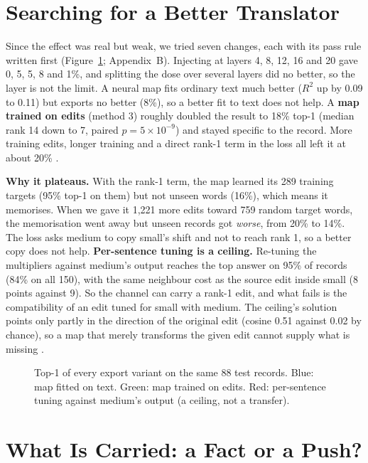 \section{Searching for a Better Translator}\label{sec:search}

Since the effect was real but weak, we tried seven changes, each with its pass rule written first (Figure~\ref{fig:ladder}; Appendix~B). Injecting at layers 4, 8, 12, 16 and 20 gave 0, 5, 5, 8 and 1\%, and splitting the dose over several layers did no better, so the layer is not the limit. A neural map fits ordinary text much better ($R^2$ up by 0.09 to 0.11) but exports no better (8\%), so a better fit to text does not help. A \textbf{map trained on edits} (method 3) roughly doubled the result to 18\% top-1 (median rank 14 down to 7, paired $p=5\times10^{-9}$) and stayed specific to the record. More training edits, longer training and a direct rank-1 term in the loss all left it at about 20\% \cite{p16,p17}.

\textbf{Why it plateaus.} With the rank-1 term, the map learned its 289 training targets (95\% top-1 on them) but not unseen words (16\%), which means it memorises. When we gave it 1,221 more edits toward 759 random target words, the memorisation went away but unseen records got \emph{worse}, from 20\% to 14\%. The loss asks medium to copy small's shift and not to reach rank 1, so a better copy does not help. \textbf{Per-sentence tuning is a ceiling.} Re-tuning the multipliers against medium's output reaches the top answer on 95\% of records (84\% on all 150), with the same neighbour cost as the source edit inside small (8 points against 9). So the channel can carry a rank-1 edit, and what fails is the compatibility of an edit tuned for small with medium. The ceiling's solution points only partly in the direction of the original edit (cosine 0.51 against 0.02 by chance), so a map that merely transforms the given edit cannot supply what is missing \cite{p16,p17}.

\begin{figure}[!htb]
\centering
{}
\caption{Top-1 of every export variant on the same 88 test records. Blue: map fitted on text. Green: map trained on edits. Red: per-sentence tuning against medium's output (a ceiling, not a transfer).}\label{fig:ladder}
\end{figure}

\section{What Is Carried: a Fact or a Push?}\label{sec:push}

